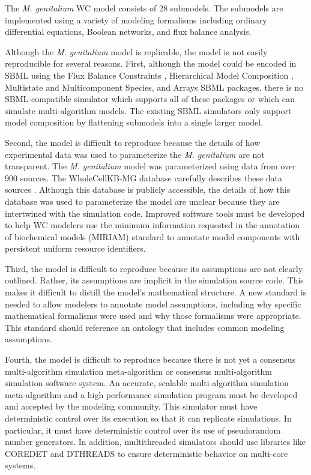 \documentclass[journal,transmag,twoside]{IEEEtran}
\begin{document}
The \textit{M. genitalium} WC model \cite{Karr2012} consists of 28 submodels.
The submodels are implemented using a variety of modeling formalisms including
ordinary differential equations, Boolean networks, and flux balance analysis.

Although the \textit{M. genitalium} model is replicable, the model is not easily reproducible for several reasons. First,
although the model could be encoded in SBML using the Flux Balance Constraints \cite{olivier2015fbc}, Hierarchical Model Composition \cite{smith2015sbml}, Multistate and Multicomponent
Species, and Arrays \cite{watanabe2016efficient} SBML packages, there is no SBML-compatible simulator which supports all of these packages or
which can simulate multi-algorithm models. The existing SBML simulators only support 
model composition by flattening submodels into a single larger model. 

Second, the model is difficult to reproduce because the details of how experimental data was used to parameterize the \textit{M. genitalium}
are not transparent. The \textit{M. genitalium} model was parameterized using data from over 900 
sources. The WholeCellKB-MG database carefully describes these data sources \cite{karr2013wholecellkb}. Although this database is publicly accessible, 
the details of how this database was used to parameterize the model are unclear
because they are intertwined with the simulation code. 
Improved software tools must be developed to help WC modelers use the minimum information 
requested in the annotation of biochemical models (MIRIAM) \cite{novere2005minimum}
standard to annotate model components with persistent uniform resource identifiers. 

Third, the model is difficult to reproduce because its assumptions are not clearly outlined. Rather, its assumptions are
implicit in the simulation source code. This makes it difficult
to distill the model's mathematical structure. A new standard is needed to allow modelers to annotate model assumptions, including why
specific mathematical formalisms were used and why those formalisms were appropriate. This standard should reference an ontology that 
includes common modeling assumptions.

Fourth, the model is difficult to reproduce because there is not yet a consensus multi-algorithm simulation meta-algorithm 
or consensus multi-algorithm simulation software system. An accurate, scalable multi-algorithm simulation meta-algorithm
and a high performance simulation program must be developed and accepted by the modeling community. This 
simulator must have deterministic control over its execution so that it can replicate 
simulations. In particular, it must have deterministic control over its use of pseudorandom number generators. 
In addition, multithreaded simulators should use libraries like C{\small ORE}D{\small ET} and D{\small THREADS} to 
ensure deterministic behavior on multi-core systems.
\end{document}
